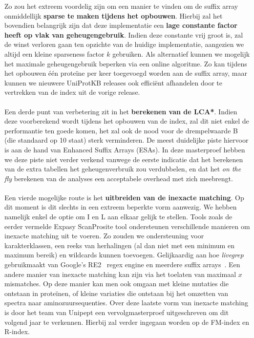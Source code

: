 Zo zou het extreem voordelig zijn om een manier te vinden om de suffix array onmiddellijk \textbf{sparse te maken tijdens het opbouwen}.
Hierbij zal het bovendien belangrijk zijn dat deze implementatie een \textbf{lage constante factor heeft op vlak van geheugengebruik}.
Indien deze constante vrij groot is, zal de winst verloren gaan ten opzichte van de huidige implementatie, aangezien we altijd een kleine sparseness factor $k$ gebruiken.
Als alternatief kunnen we mogelijk het maximale geheugengebruik beperken via een online algoritme.
Zo kan tijdens het opbouwen één proteïne per keer toegevoegd worden aan de suffix array, maar kunnen we nieuwere UniProtKB releases ook efficiënt afhandelen door te vertrekken van de index uit de vorige release.
\\ \\
Een derde punt van verbetering zit in het \textbf{berekenen van de LCA*}.
Indien deze voorberekend wordt tijdens het opbouwen van de index, zal dit niet enkel de performantie ten goede komen, het zal ook de nood voor de drempelwaarde B (die standaard op 10 staat) sterk verminderen.
De meest duidelijke piste hiervoor is aan de hand van Enhanced Suffix Arrays (ESAs).
In deze masterproef hebben we deze piste niet verder verkend vanwege de eerste indicatie dat het berekenen van de extra tabellen het geheugenverbruik zou verdubbelen, en dat het \textit{on the fly} berekenen van de analyses een acceptabele overhead met zich meebrengt.
\\ \\
Een vierde mogelijke route is het \textbf{uitbreiden van de inexacte matching}.
Op dit moment is dit slechts in een extreem beperkte vorm aanwezig.
We hebben namelijk enkel de optie om I en L aan elkaar gelijk te stellen.
Tools zoals de eerder vermelde Expasy ScanProsite tool ondersteunen verschillende manieren om inexacte matching uit te voeren.
Zo zouden we ondersteuning voor karakterklassen, een reeks van herhalingen (al dan niet met een minimum en maximum bereik) en wildcards kunnen toevoegen.
Gelijkaardig aan hoe \textit{livegrep}~\cite{livegrep} gebruikmaakt van Google's RE2~\cite{re2} regex engine en meerdere suffix arrays~\cite{regex_sa}.
Een andere manier van inexacte matching kan zijn via het toelaten van maximaal $x$ mismatches.
Op deze manier kan men ook omgaan met kleine mutaties die ontstaan in proteïnen, of kleine variaties die ontstaan bij het omzetten van spectra naar aminozuursequenties.
Over deze laatste vorm van inexacte matching is door het team van Unipept een vervolgmasterproef uitgeschreven om dit volgend jaar te verkennen.
Hierbij zal verder ingegaan worden op de FM-index en R-index.